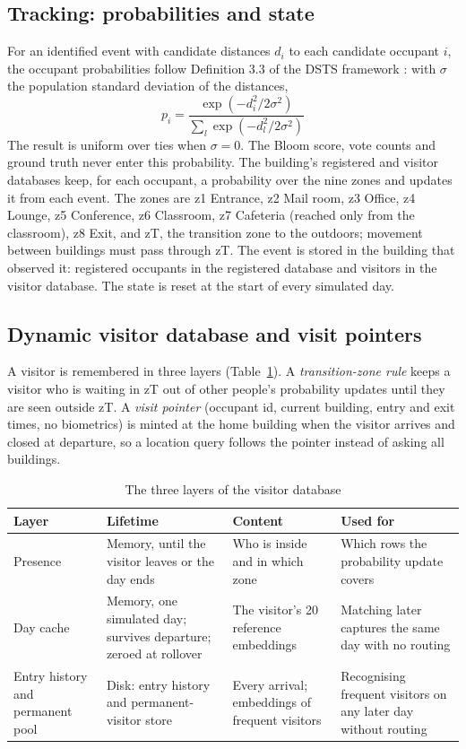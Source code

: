 \documentclass[12pt,a4paper,oneside]{report}
\begin{document}
\subsection{Tracking: probabilities and state}
For an identified event with candidate distances $d_i$ to each candidate occupant $i$, the occupant probabilities follow Definition 3.3 of the DSTS framework \cite{ref6}: with $\sigma$ the population standard deviation of the distances,
\begin{equation}\label{eq:prob}
p_i=\frac{\exp\!\left(-d_i^{2}/2\sigma^{2}\right)}{\sum_{l}\exp\!\left(-d_l^{2}/2\sigma^{2}\right)}
\end{equation}
The result is uniform over ties when $\sigma=0$. The Bloom score, vote counts and ground truth never enter this probability. The building's registered and visitor databases keep, for each occupant, a probability over the nine zones and updates it from each event. The zones are z1 Entrance, z2 Mail room, z3 Office, z4 Lounge, z5 Conference, z6 Classroom, z7 Cafeteria (reached only from the classroom), z8 Exit, and zT, the transition zone to the outdoors; movement between buildings must pass through zT. The event is stored in the building that observed it: registered occupants in the registered database and visitors in the visitor database. The state is reset at the start of every simulated day.

\subsection{Dynamic visitor database and visit pointers}
A visitor is remembered in three layers (Table~\ref{tab:visitor}). A \emph{transition-zone rule} keeps a visitor who is waiting in zT out of other people's probability updates until they are seen outside zT. A \emph{visit pointer} (occupant id, current building, entry and exit times, no biometrics) is minted at the home building when the visitor arrives and closed at departure, so a location query follows the pointer instead of asking all buildings.

\begin{table}[htbp]
\centering
\caption{The three layers of the visitor database}\label{tab:visitor}
{\small\setlength{\tabcolsep}{4pt}\renewcommand{\arraystretch}{1.2}
\begin{tabular}{|p{2.68cm}|p{3.83cm}|p{3.64cm}|p{3.83cm}|}\hline
\textbf{Layer} & \textbf{Lifetime} & \textbf{Content} & \textbf{Used for}\\\hline
Presence & Memory, until the visitor leaves or the day ends & Who is inside and in which zone & Which rows the probability update covers\\\hline
Day cache & Memory, one simulated day; survives departure; zeroed at rollover & The visitor's 20 reference embeddings & Matching later captures the same day with no routing\\\hline
Entry history and permanent pool & Disk: entry history and permanent-visitor store & Every arrival; embeddings of frequent visitors & Recognising frequent visitors on any later day without routing\\\hline
\end{tabular}}
\end{table}
\end{document}
